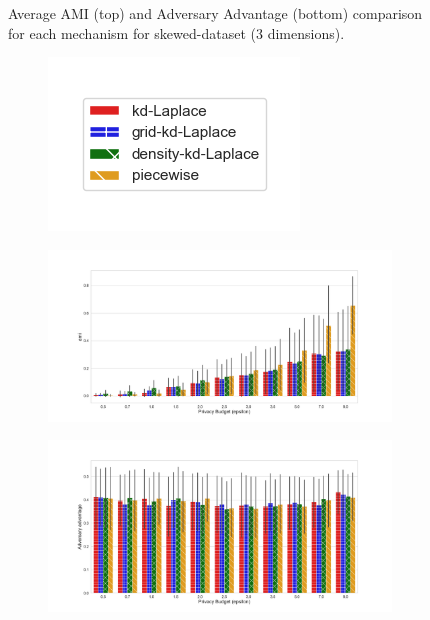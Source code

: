\begin{figure}[H]
\begin{subfigure}{1\textwidth}
    \end{subfigure}
    \caption{Average AMI (top) and Adversary Advantage (bottom) comparison for each mechanism for skewed-dataset (3 dimensions).}
    \label{fig:utility_skewed-dataset_comparison_nd_plot}
\end{figure}
\newpage



\begin{figure}[H]
    \centering
    \begin{subfigure}{0.30\textwidth}
        \includegraphics[width=\textwidth]{Results/kd-laplace/ami_bar_comparison_legend.png}
    \end{subfigure}
    \begin{subfigure}{1\textwidth}
        \includegraphics[width=1\textwidth]{Results/kd-laplace/ami_line-dataset_comparison.png}
    \end{subfigure}
    \begin{subfigure}{1\textwidth}
        \includegraphics[width=1\textwidth]{Results/kd-laplace/shokri_mi_adv_line-dataset_comparison.png}

\end{subfigure}
\end{figure}
